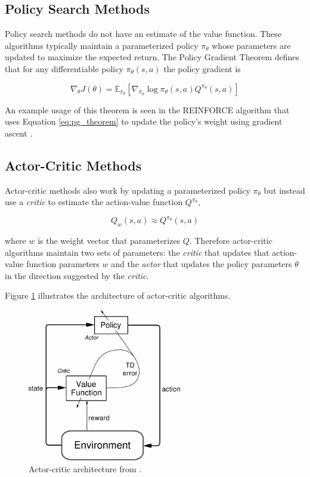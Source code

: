 \subsection{Policy Search Methods}

Policy search methods do not have an estimate of the value function. These algorithms typically maintain a parameterized policy $\pi_\theta$
whose parameters are updated to maximize the expected return.
The Policy Gradient Theorem defines that for any differentiable policy $\pi_\theta(s,a)$ the policy
gradient is

 \begin{equation}
     \nabla_\theta J(\theta) = \mathbb{E}_{\pi_\theta}[\nabla_{\pi_\theta} \log{\pi_\theta(s,a) Q^{\pi_\theta}(s,a)}]
     \label{eq:pg_theorem}
 \end{equation}

 An example usage of this theorem is seen in the REINFORCE algorithm that uses Equation \eqref{eq:pg_theorem}
 to update the policy's weight using gradient ascent \cite{REINFORCE}.

\subsection{Actor-Critic Methods}

Actor-critic methods also work by updating a parameterized policy $\pi_\theta$ but instead use a \textit{critic}
to estimate the action-value function \(Q^{\pi_\theta}\),

\[
 Q_w(s,a) \approx Q^{\pi_\theta}(s,a)
\]

where \(w\) is the weight vector that parameterizes $Q$. Therefore actor-critic algorithms maintain two
sets of parameters: the \textit{critic} that updates that action-value function parameters \(w\) and
the \textit{actor} that updates the policy parameters \(\theta\) in the direction suggested by the \textit{critic}.

Figure \ref{fig:actor_critic} illustrates the architecture of actor-critic algorithms.

\begin{figure}[ht] 
    \centering
    \includegraphics[width=0.6\textwidth]{Chapter2/actor_critic.png}
    \caption{Actor-critic architecture from \cite{Sutton1998}.}
  \label{fig:actor_critic}
\end{figure}

